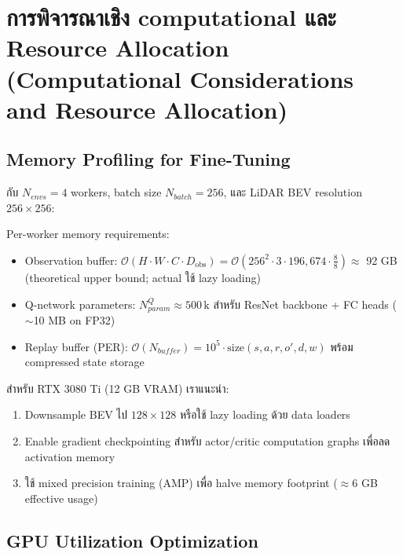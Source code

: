\documentclass[10pt,a4paper,twocolumn]{article}
\begin{document}
\section{การพิจารณาเชิง computational และ Resource Allocation (Computational Considerations and Resource Allocation)}

\subsection{Memory Profiling for Fine-Tuning}

กับ $N_{envs}=4$ workers, batch size $N_{batch}=256$, และ LiDAR BEV resolution $256 \times 256$:

Per-worker memory requirements:
\begin{itemize}
    \item Observation buffer: $\mathcal{O}(H \cdot W \cdot C \cdot D_{\text{obs}}) = \mathcal{O}(256^2 \cdot 3 \cdot 196,674 \cdot \frac{8}{8}) \approx$ 92 GB (theoretical upper bound; actual ใช้ lazy loading)
    
    \item Q-network parameters: $N_{param}^{Q} \approx 500\,\text{k}$ สำหรับ ResNet backbone + FC heads ($\sim$10 MB on FP32)
    
    \item Replay buffer (PER): $\mathcal{O}(N_{buffer}) = 10^5 \cdot \text{size}(s,a,r,o',d,w)$ พร้อม compressed state storage
\end{itemize}

สำหรับ RTX 3080 Ti (12 GB VRAM) เราแนะนำ:
\begin{enumerate}
    \item Downsample BEV ไป $128 \times 128$ หรือใช้ lazy loading ด้วย data loaders
    
    \item Enable gradient checkpointing สำหรับ actor/critic computation graphs เพื่อลด activation memory
    
    \item ใช้ mixed precision training (AMP) เพื่อ halve memory footprint ($\approx$6 GB effective usage)
\end{enumerate}

\subsection{GPU Utilization Optimization}
\end{document}
